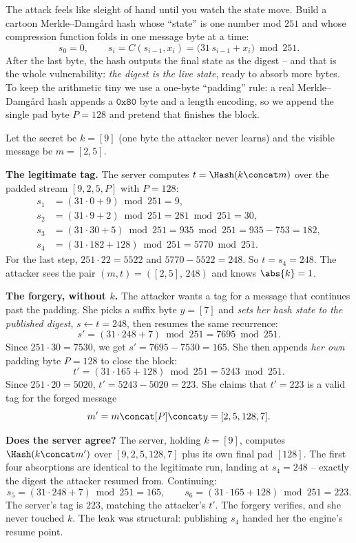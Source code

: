 The attack feels like sleight of hand until you watch the state move. Build a cartoon Merkle--Damg\aa{}rd hash whose ``state'' is one number mod $251$ and whose compression function folds in one message byte at a time:
\[
  s_0 = 0,\qquad s_{i} = C(s_{i-1}, x_i) = \big(31\,s_{i-1} + x_i\big)\bmod 251.
\]
After the last byte, the hash outputs the final state as the digest -- and that is the whole vulnerability: \emph{the digest is the live state}, ready to absorb more bytes. To keep the arithmetic tiny we use a one-byte ``padding'' rule: a real Merkle--Damg\aa{}rd hash appends a $\texttt{0x80}$ byte and a length encoding, so we append the single pad byte $P=128$ and pretend that finishes the block.

Let the secret be $k=[9]$ (one byte the attacker never learns) and the visible message be $m=[2,5]$.

\begin{walkbox}
\textbf{The legitimate tag.} The server computes $t=\Hash(k\concat m)$ over the padded stream $[9,2,5,P]$ with $P=128$:
\begin{align*}
 s_1 &= (31\cdot 0 + 9)\bmod 251 = 9,\\
 s_2 &= (31\cdot 9 + 2)\bmod 251 = 281\bmod 251 = 30,\\
 s_3 &= (31\cdot 30 + 5)\bmod 251 = 935\bmod 251 = 935 - 753 = 182,\\
 s_4 &= (31\cdot 182 + 128)\bmod 251 = 5770\bmod 251.
\end{align*}
For the last step, $251\cdot 22 = 5522$ and $5770-5522 = 248$. So $t = s_4 = 248$. The attacker sees the pair $(m,t)=([2,5],\,248)$ and knows $\abs{k}=1$.
\end{walkbox}

\begin{walkbox}
\textbf{The forgery, without $k$.} The attacker wants a tag for a message that continues past the padding. She picks a suffix byte $y=[7]$ and \emph{sets her hash state to the published digest}, $s\leftarrow t = 248$, then resumes the same recurrence:
\[
  s' = (31\cdot 248 + 7)\bmod 251 = 7695\bmod 251.
\]
Since $251\cdot 30 = 7530$, we get $s' = 7695 - 7530 = 165$. She then appends \emph{her own} padding byte $P=128$ to close the block:
\[
  t' = (31\cdot 165 + 128)\bmod 251 = 5243\bmod 251.
\]
Since $251\cdot 20 = 5020$, $t' = 5243 - 5020 = 223$. She claims that $t'=223$ is a valid tag for the forged message
\[
  m' = m \concat [P] \concat y = [2,5,128,7].
\]
\end{walkbox}

\begin{walkbox}
\textbf{Does the server agree?} The server, holding $k=[9]$, computes $\Hash(k\concat m')$ over $[9,2,5,128,7]$ plus its own final pad $[128]$. The first four absorptions are identical to the legitimate run, landing at $s_4 = 248$ -- exactly the digest the attacker resumed from. Continuing:
\[
  s_5 = (31\cdot 248 + 7)\bmod 251 = 165,\qquad s_6 = (31\cdot 165 + 128)\bmod 251 = 223.
\]
The server's tag is $223$, matching the attacker's $t'$. The forgery verifies, and she never touched $k$. The leak was structural: publishing $s_4$ handed her the engine's resume point.
\end{walkbox}

